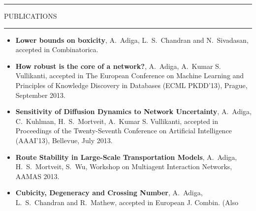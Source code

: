 \documentclass{article}
\begin{document}
\hrule\vspace{-2mm}
\begin{center}
PUBLICATIONS\\
\end{center}
\vspace{-2mm}\hrule\vspace{2mm}
\begin{itemize}
\item \textbf{Lower bounds on boxicity}, A.~Adiga, L.~S.~Chandran and
N.~Sivadasan, accepted in Combinatorica.%
\item \textbf{How robust is the core of a network?},
A.~Adiga, A.~Kumar S. Vullikanti, accepted in
The European Conference on Machine Learning and Principles of Knowledge
Discovery in Databases (ECML PKDD'13), Prague, September 2013.
\item \textbf{Sensitivity of Diffusion Dynamics to Network Uncertainty},
A.~Adiga, C.~Kuhlman, H.~S.~Mortveit, A.~Kumar S. Vullikanti, accepted in
Proceedings of the Twenty-Seventh Conference on Artificial Intelligence
(AAAI'13), Bellevue, July 2013.
\item \textbf{Route Stability in Large-Scale Transportation Models},
A.~Adiga, H.~S.~Mortveit, S.~Wu, Workshop on Multiagent Interaction
Networks, AAMAS 2013.
\item \textbf{Cubicity, Degeneracy and Crossing Number}, A.~Adiga,
L.~S.~Chandran and R.~Mathew, accepted in European J. Combin. (Also

\end{itemize}
\end{document}
